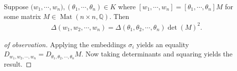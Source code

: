 \begin{observation}

Suppose
\(\mathbf{(}w_1, \cdots, w_n), (\theta_1, \cdots, \theta_n) \in K\)
where
\({\left[ {w_1, \cdots, w_n} \right]} = {\left[ { \theta_1, \cdots, \theta_n } \right]} M\)
for some matrix \(M\in \operatorname{Mat}(n\times n, {\mathbb{Q}})\).
Then
\begin{align*}
\Delta({ {w}_1, {w}_2, \cdots, {w}_{n}}) = \Delta({ {\theta}_1, {\theta}_2, \cdots, {\theta}_{n}}) \det(M)^2
.\end{align*}

\end{observation}

\begin{proof}[of observation]

Applying the embeddings \(\sigma_i\) yields an equality
\(D_{ { {w}_1, {w}_2, \cdots, {w}_{n}} }= D_{{ {\theta }_1, {\theta }_2, \cdots, {\theta }_{n}} } M\).
Now taking determinants and squaring yields the result.

\end{proof}

